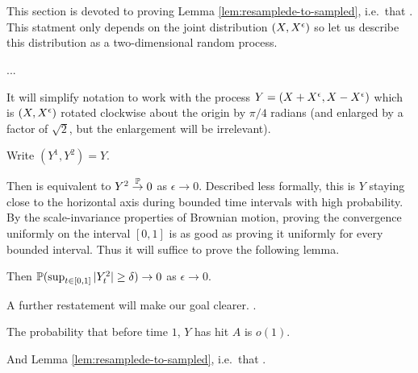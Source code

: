 {
\section{}
\label{sec:proof-of-lem:resamplede-to-sampled}

\newcommand{\bandwidth}{\delta}
\newcommand{\rotproc}{Y}

\newcommand{\union}{\cup}
\renewcommand{\L}{L^+ \union L^-}
\newcommand{\Le}{L^\epsilon}

This section is devoted to proving Lemma
\ref{lem:resamplede-to-sampled}, i.e.\ that
\statementoflemresampledetosampled.  This statment only depends on the
joint distribution $(\sampled, \resamplede)$ so let us describe this
distribution as a two-dimensional random process.

...

It will simplify notation to work with the process $\rotproc =
(\sampled + \resamplede, \sampled - \resamplede)$ which is $(\sampled,
\resamplede)$ rotated clockwise about the origin by $\pi / 4$ radians (and enlarged by a factor of
$\sqrt{2}$, but the enlargement will be irrelevant).

Write $(\rotproc^1, \rotproc^2) = Y$.

Then \statementoflemresampledetosampled{} is equivalent to $\rotproc^2
\toinP 0$ as $\epsilon \to 0$.
Described less formally, this is $\rotproc$ staying close to the
horizontal axis during bounded time intervals with high probability.
By the scale-invariance properties of Brownian motion, proving the
convergence uniformly on the interval $[0,1]$ is as good as proving it
uniformly for every bounded interval.  Thus it will suffice to prove
the following lemma.

\begin{lemma}
  Then $\P(\sup_{t \in [0,1]} |Y^2_t| \ge \delta) \to 0$ as $\epsilon
  \to 0$.
\end{lemma}

\newcommand{\boundarylines}{A}

A further restatement will make our goal clearer.  \FIXME{}{Introduce
  $\boundarylines$}.

\begin{lemma}
  \label{lem:hit-boundary-lines-o1}
  The probability that before time $1$, $Y$ has hit $\boundarylines$
  is $o(1)$.
\end{lemma}

And Lemma \ref{lem:resamplede-to-sampled}, i.e.\ that \statementoflemresampledetosampled.

}

